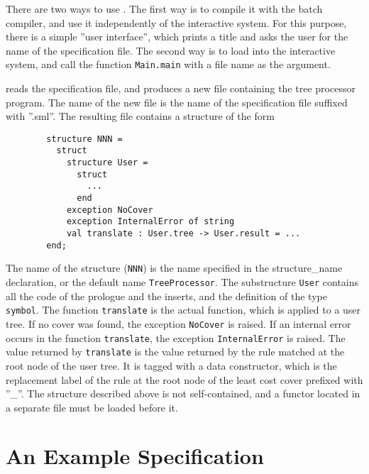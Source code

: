 There are two ways to use \mltwig. The first way is to compile it
with the batch compiler, and use it
independently of the interactive system. For this purpose, there is
a simple ''user interface'', which prints a title and asks the user
for the name of the specification file.
The second way is to load \mltwig into the interactive system, and call
the function {\tt Main.main} with a file name as the argument.

\mltwig reads the specification file, and produces a new file containing
the tree processor program. The name of the new file is the name of
the specification file suffixed with ''.sml''. 
The resulting file contains a structure of the form
\begin{verbatim}
        structure NNN =
          struct
            structure User =
              struct
                ...
              end
            exception NoCover
            exception InternalError of string
            val translate : User.tree -> User.result = ...
        end;
\end{verbatim}
The name of the structure ({\tt NNN}) is the name specified in the
structure\_name declaration, or the default name {\tt TreeProcessor}.
The substructure {\tt User} contains all the code of the prologue and
the inserts, and the definition of the type {\tt symbol}.
The function {\tt translate} is the actual function, which
is applied to a user tree. If no cover was found, the exception
{\tt NoCover} is raised. If an internal error occurs in the function
{\tt translate}, the exception {\tt InternalError} is raised.
The value returned by {\tt translate} is the value returned by
the rule matched at the root node of the user tree. It is tagged
with a data constructor, which is the replacement label of the
rule at the root node of the least cost cover prefixed with ''\_''.
The structure described above is not self-contained, and a functor
located in a separate file must be loaded before it.

\section{An Example \mltwig Specification}

